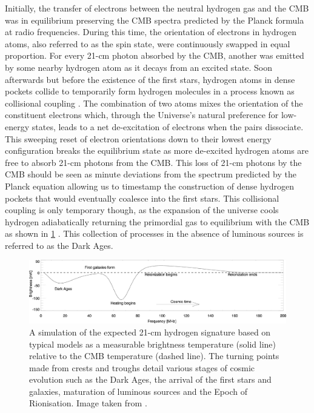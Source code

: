 Initially, the transfer of electrons between the neutral hydrogen gas and the CMB was in equilibrium preserving the CMB spectra predicted by the Planck formula at radio frequencies. During this time, the orientation of electrons in hydrogen atoms, also referred to as the spin state, were continuously swapped in equal proportion. For every 21-cm photon absorbed by the CMB, another was emitted by some nearby hydrogen atom as it decays from an excited state. Soon afterwards but before the existence of the first stars, hydrogen atoms in dense pockets collide to temporarily form hydrogen molecules in a process known as collisional coupling \citep{21in21}. The combination of two atoms mixes the orientation of the constituent electrons which, through the Universe’s natural preference for low-energy states, leads to a net de-excitation of electrons when the pairs dissociate. This sweeping reset of electron orientations down to their lowest energy configuration breaks the equilibrium state as more de-excited hydrogen atoms are free to absorb 21-cm photons from the CMB. This loss of 21-cm photons by the CMB should be seen as minute deviations from the spectrum predicted by the Planck equation allowing us to timestamp the construction of dense hydrogen pockets that would eventually coalesce into the first stars. This collisional coupling is only temporary though, as the expansion of the universe cools hydrogen adiabatically returning the primordial gas to equilibrium with the CMB as shown in \cref{fig:reionisation_hist} \citep{21in21}. This collection of processes in the absence of luminous sources is referred to as the Dark Ages.
\begin{figure}
    \centering
    \includegraphics[width=\textwidth]{21cm_signal}
    \caption{A simulation of the expected 21-cm hydrogen signature based on typical models as a measurable brightness temperature (solid line) relative to the CMB temperature (dashed line). The turning points made from crests and troughs detail various stages of cosmic evolution such as the Dark Ages, the arrival of the first stars and galaxies, maturation of luminous sources and the Epoch of Rionisation. Image taken from \citet{cosmic_signature}.}
    \label{fig:reionisation_hist}
\end{figure}

